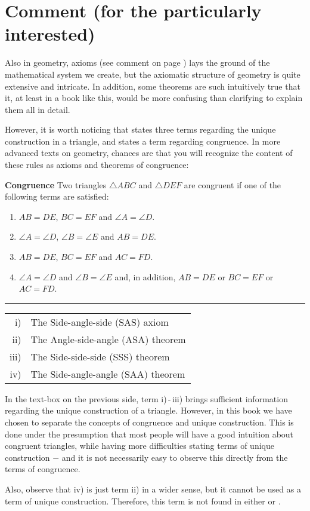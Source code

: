 



\section*{Comment (for the particularly interested)}
Also in geometry, axioms (see comment on page \pageref{Kommentar1}) lays the ground of the mathematical system we create, but the axiomatic structure of geometry is quite extensive and intricate. In addition, some theorems are such intuitively true that it, at least in a book like this, would be more confusing than clarifying to explain them all in detail.\vsk

However, it is worth noticing that  states three terms regarding the unique construction in a triangle, and  states a term regarding congruence. In more advanced texts on geometry, chances are that you will recognize the content of these rules as axioms and theorems of congruence: \regv

\begin{tcolorbox}[boxrule=0.3 mm,arc=0mm,colback=blue!5] {\large \textbf{Congruence} \vspace{5 pt}}\newline
	Two triangles $ \triangle ABC $ and $ \triangle DEF $ are congruent if one of the following terms are satisfied:
	\begin{enumerate}[label=\roman*)]
		\item $ AB=DE $, $ BC=EF $ and $ \angle A=\angle D $.
		\item $ \angle A=\angle D $, $ \angle B=\angle E $ and $ AB=DE $.
		\item $ AB=DE $, $ BC=EF $ and $ AC=FD $.
		\item $ {\angle A=\angle D} $ and $ {\angle B=\angle E} $ and, in addition, $ {AB=DE} $ or $ BC=EF $ or $ AC=FD $.
	\end{enumerate}
\rule{1\linewidth}{0.75bp}
\begin{center}
	\begin{tabular}{rl}
		i) &The Side-angle-side (SAS) axiom\\
		ii) &The Angle-side-angle (ASA) theorem\\
		iii) & The Side-side-side (SSS) theorem \\
		iv) & The Side-angle-angle (SAA) theorem 
	\end{tabular}
\end{center}
\end{tcolorbox}
\newpage
In the text-box on the previous side, term i)\,-\,iii) brings sufficient information regarding the unique construction of a triangle. However, in this book we have chosen to separate the concepts of congruence and unique construction. This is done under the presumption that most people will have a good intuition about congruent triangles, while having more difficulties stating terms of unique construction $ - $  and it is not necessarily easy to observe this directly from the terms of congruence.\vsk

Also, observe that iv) is just term ii) in a wider sense, but it cannot be used as a term of unique construction. Therefore, this term is not found in either  or .


